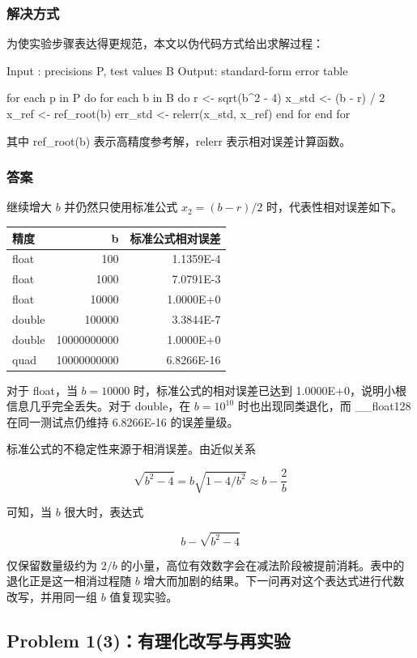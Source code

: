 \documentclass[12pt,a4paper,fontset=none]{ctexart}
\newcommand{\blocktitle}[1]{\subsubsection{#1}}
\newcommand{\codeinline}[1]{{\normalfont #1}}
\newcounter{none}
\begin{document}
\blocktitle{解决方式}

为使实验步骤表达得更规范，本文以伪代码方式给出求解过程：

\begin{CodeBlock}
Input : precisions P, test values B
Output: standard-form error table

for each p in P do
    for each b in B do
        r <- sqrt(b^2 - 4)
        x_std <- (b - r) / 2
        x_ref <- ref_root(b)
        err_std <- relerr(x_std, x_ref)
    end for
end for
\end{CodeBlock}

其中 \codeinline{ref\_root(b)} 表示高精度参考解，\codeinline{relerr} 表示相对误差计算函数。

\blocktitle{答案}

继续增大 \(b\) 并仍然只使用标准公式 \(x_2=(b-r)/2\) 时，代表性相对误差如下。

{\def\LTcaptype{none} %
\begin{longtable}[]{@{}lrr@{}}
\toprule\noalign{}
精度 & b & 标准公式相对误差 \\
\midrule\noalign{}
\endhead
\bottomrule\noalign{}
\endlastfoot
float & 100 & 1.1359E-4 \\
float & 1000 & 7.0791E-3 \\
float & 10000 & 1.0000E+0 \\
double & 100000 & 3.3844E-7 \\
double & 10000000000 & 1.0000E+0 \\
quad & 10000000000 & 6.8266E-16 \\
\end{longtable}
}

对于 \codeinline{float}，当 \(b=10000\) 时，标准公式的相对误差已达到 1.0000E+0，说明小根信息几乎完全丢失。对于 \codeinline{double}，在 \(b=10^{10}\) 时也出现同类退化，而 \codeinline{\_\_float128} 在同一测试点仍维持 6.8266E-16 的误差量级。

标准公式的不稳定性来源于相消误差。由近似关系

\[
\sqrt{b^2-4} = b\sqrt{1-4/b^2} \approx b - \frac{2}{b}
\]

可知，当 \(b\) 很大时，表达式

\[
b - \sqrt{b^2 - 4}
\]

仅保留数量级约为 \(2/b\) 的小量，高位有效数字会在减法阶段被提前消耗。表中的退化正是这一相消过程随 \(b\) 增大而加剧的结果。下一问再对这个表达式进行代数改写，并用同一组 \(b\) 值复现实验。

\subsection{Problem 1(3)：有理化改写与再实验}\label{problem-13ux6709ux7406ux5316ux6539ux5199ux4e0eux518dux5b9eux9a8c}
\end{document}
